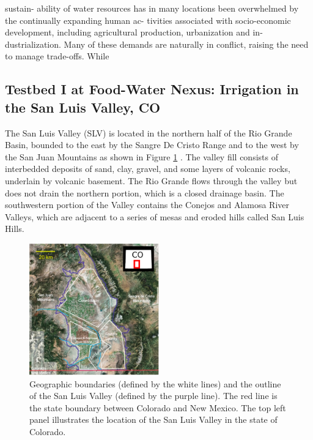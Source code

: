 \documentclass[11pt,final]{article}%
\renewcommand{\citep}{\cite}
\begin{document}
sustain- ability of water resources has in many locations been overwhelmed by the continually expanding human ac- tivities associated with socio-economic development, including agricultural production, urbanization and in- dustrialization. Many of these demands are naturally in conflict, raising the need to manage trade-offs. While

\subsection{Testbed I at Food-Water Nexus: Irrigation in the San Luis Valley, CO }\label{sec:SLV}
The San Luis Valley (SLV) is located in the northern half of the Rio Grande Basin, bounded to the east by the Sangre De Cristo Range and to the west by the San Juan Mountains as shown in Figure \ref{fig:SLV} \citep{SLV_report}. The valley fill consists of interbedded deposits of sand, clay, gravel, and some layers of volcanic rocks, underlain by volcanic basement. The Rio Grande flows through the valley but does not drain the northern portion, which is a closed drainage basin. The southwestern portion of the Valley contains the Conejos and Alamosa River Valleys, which are adjacent to a series of mesas and eroded hills called San Luis Hills.

\begin{figure}
\noindent\includegraphics[width=0.5\textwidth]{Figures/SLV.pdf}
\caption{Geographic boundaries (defined by the white lines) and the outline of the San Luis Valley (defined by the purple line). The red line is the state boundary between Colorado and New Mexico. The top left panel illustrates the location of the San Luis Valley in the state of Colorado.}
\label{fig:SLV}
\end{figure}
\end{document}
